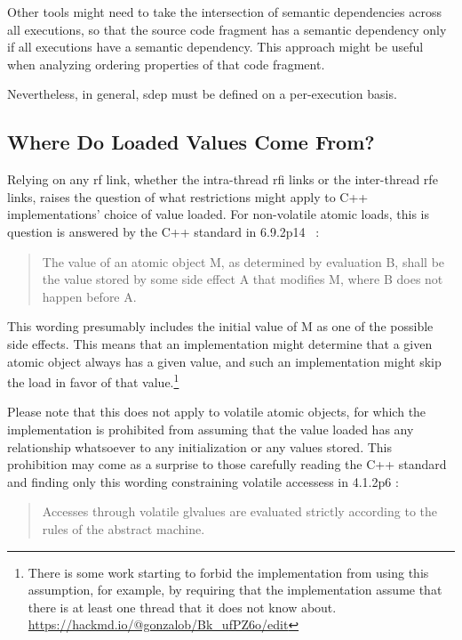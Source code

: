 \documentclass[10]{article}
\begin{document}
Other tools might need to take the intersection of semantic dependencies
across all executions, so that the source code fragment has a semantic
dependency only if all executions have a semantic dependency.
This approach might be useful when analyzing ordering properties
of that code fragment.

Nevertheless, in general, sdep must be defined on a per-execution basis.

\subsection{Where Do Loaded Values Come From?}
\label{sec:Where Do Loaded Values Come From?}

Relying on any rf link, whether the intra-thread rfi links or the
inter-thread rfe links, raises the question of what restrictions
might apply to C++ implementations' choice of value loaded.
For non-volatile atomic loads, this is question is answered by
the C++ standard in 6.9.2p14
~\cite{ThomasKoeppe2023N4950}:

\begin{quote}
	The value of an atomic object M, as determined by evaluation B,
	shall be the value stored by some side effect A that modifies M,
	where B does not happen before A.
\end{quote}

This wording presumably includes the initial value of M as one of the
possible side effects.
This means that an implementation might determine that a given atomic
object always has a given value, and such an implementation might
skip the load in favor of that value.\footnote{
	There is some work starting to forbid the implementation
	from using this assumption, for example, by requiring that
	the implementation assume that there is at least one thread
	that it does not know about.
	\url{https://hackmd.io/@gonzalob/Bk_ufPZ6o/edit}}

Please note that this does not apply to volatile atomic objects,
for which the implementation is prohibited from assuming that the
value loaded has any relationship whatsoever to any initialization
or any values stored.
This prohibition may come as a surprise to those carefully reading the
C++ standard~\cite{ThomasKoeppe2023N4950}
and finding only this wording constraining volatile accessess in
4.1.2p6
:

\begin{quote}
	Accesses through volatile glvalues are evaluated strictly
	according to the rules of the abstract machine.
\end{quote}
\end{document}
